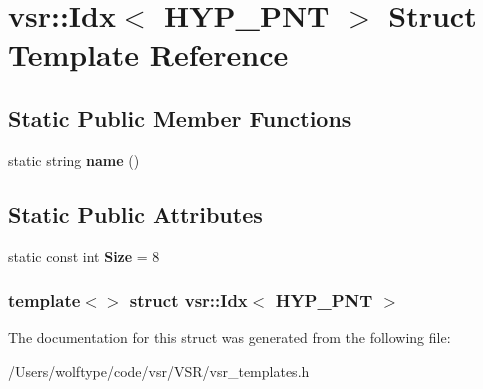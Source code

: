 \hypertarget{structvsr_1_1_idx_3_01_h_y_p___p_n_t_01_4}{\section{vsr\-:\-:Idx$<$ H\-Y\-P\-\_\-\-P\-N\-T $>$ Struct Template Reference}
\label{structvsr_1_1_idx_3_01_h_y_p___p_n_t_01_4}
}
\subsection*{Static Public Member Functions}
\begin{DoxyCompactItemize}
\item 
\hypertarget{structvsr_1_1_idx_3_01_h_y_p___p_n_t_01_4_ae7082845cc5c73b6abb119d7da99b72b}{static string {\bfseries name} ()}\label{structvsr_1_1_idx_3_01_h_y_p___p_n_t_01_4_ae7082845cc5c73b6abb119d7da99b72b}

\end{DoxyCompactItemize}
\subsection*{Static Public Attributes}
\begin{DoxyCompactItemize}
\item 
\hypertarget{structvsr_1_1_idx_3_01_h_y_p___p_n_t_01_4_abad382e20c357a735fe4f70f1c197430}{static const int {\bfseries Size} = 8}\label{structvsr_1_1_idx_3_01_h_y_p___p_n_t_01_4_abad382e20c357a735fe4f70f1c197430}

\end{DoxyCompactItemize}
\subsubsection*{template$<$$>$ struct vsr\-::\-Idx$<$ H\-Y\-P\-\_\-\-P\-N\-T $>$}



The documentation for this struct was generated from the following file\-:\begin{DoxyCompactItemize}
\item 
/\-Users/wolftype/code/vsr/\-V\-S\-R/vsr\-\_\-templates.\-h\end{DoxyCompactItemize}
